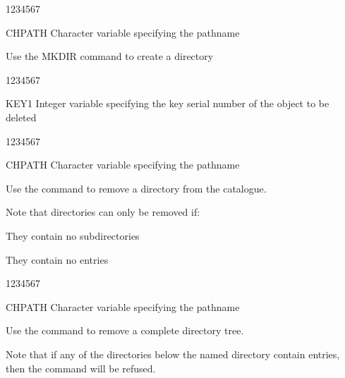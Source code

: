
\begin{DLtt}{1234567}
\item[CHPATH]Character variable specifying the pathname
\end{DLtt}

Use the MKDIR command to create a directory


\begin{DLtt}{1234567}
\item[KEY1]Integer variable specifying the key serial number of the
  object to be deleted
\end{DLtt}


\begin{DLtt}{1234567}
\item[CHPATH]Character variable specifying the pathname
\end{DLtt}

Use the  command to remove a directory from the catalogue.

Note that directories can only be removed if:
\begin{OL}
\item They contain no subdirectories
\item They contain no entries
\end{OL}

\begin{DLtt}{1234567}
\item[CHPATH]Character variable specifying the pathname
\end{DLtt}

Use the  command to remove a complete directory tree.

Note that if any of the directories below the named directory
contain entries, then the command will be refused.
